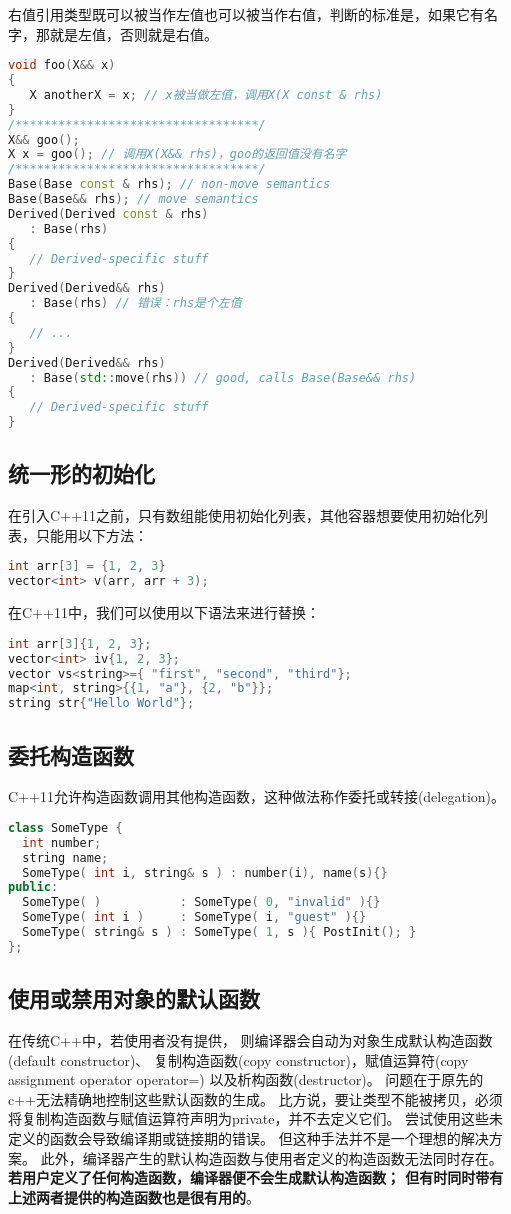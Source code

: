 右值引用类型既可以被当作左值也可以被当作右值，判断的标准是，如果它有名字，那就是左值，否则就是右值。
\begin{lstlisting}[language=C++]
void foo(X&& x)
{
   X anotherX = x; // x被当做左值，调用X(X const & rhs)
}
/**********************************/
X&& goo();
X x = goo(); // 调用X(X&& rhs)，goo的返回值没有名字
/**********************************/
Base(Base const & rhs); // non-move semantics
Base(Base&& rhs); // move semantics
Derived(Derived const & rhs) 
   : Base(rhs)
{
   // Derived-specific stuff
}
Derived(Derived&& rhs) 
   : Base(rhs) // 错误：rhs是个左值
{
   // ...
}
Derived(Derived&& rhs) 
   : Base(std::move(rhs)) // good, calls Base(Base&& rhs)
{
   // Derived-specific stuff
}
\end{lstlisting}


\subsection{统一形的初始化}
在引入C++11之前，只有数组能使用初始化列表，其他容器想要使用初始化列表，只能用以下方法：
\begin{lstlisting}[language=C++]
int arr[3] = {1, 2, 3}  
vector<int> v(arr, arr + 3); 
\end{lstlisting}

在C++11中，我们可以使用以下语法来进行替换：
\begin{lstlisting}[language=C++]
int arr[3]{1, 2, 3};  
vector<int> iv{1, 2, 3};
vector vs<string>={ "first", "second", "third"};
map<int, string>{{1, "a"}, {2, "b"}};  
string str{"Hello World"}; 
\end{lstlisting}

\subsection{委托构造函数}
C++11允许构造函数调用其他构造函数，这种做法称作委托或转接(delegation)。
\begin{lstlisting}[language=C++]
class SomeType {
  int number;
  string name;
  SomeType( int i, string& s ) : number(i), name(s){}
public:
  SomeType( )           : SomeType( 0, "invalid" ){}
  SomeType( int i )     : SomeType( i, "guest" ){}
  SomeType( string& s ) : SomeType( 1, s ){ PostInit(); }
};
\end{lstlisting}

\subsection{使用或禁用对象的默认函数}
在传统C++中，若使用者没有提供， 则编译器会自动为对象生成默认构造函数(default constructor)、 复制构造函数(copy constructor)，赋值运算符(copy assignment operator operator=) 以及析构函数(destructor)。
问题在于原先的c++无法精确地控制这些默认函数的生成。
比方说，要让类型不能被拷贝，必须将复制构造函数与赋值运算符声明为private，并不去定义它们。
尝试使用这些未定义的函数会导致编译期或链接期的错误。
但这种手法并不是一个理想的解决方案。
此外，编译器产生的默认构造函数与使用者定义的构造函数无法同时存在。
\textbf{若用户定义了任何构造函数，编译器便不会生成默认构造函数； 但有时同时带有上述两者提供的构造函数也是很有用的}。


